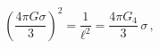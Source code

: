 \begin{equation}\left(\frac{4\pi G \sigma}{3}\right)^2=\frac{1}{\ell^2}=
\frac{4\pi G_4}{3}\,\sigma\,,\end{equation}

